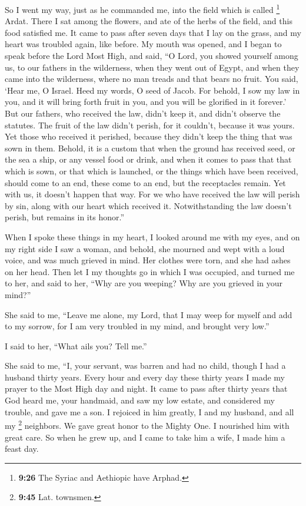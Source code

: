  So I went my way, just as he commanded me, into the
field which is called \footnote{\textbf{9:26} The Syriac and Aethiopic
  have Arphad.} Ardat. There I sat among the flowers, and ate of the
herbs of the field, and this food satisfied me.  It came
to pass after seven days that I lay on the grass, and my heart was
troubled again, like before.  My mouth was opened, and I
began to speak before the Lord Most High, and said,  ``O
Lord, you showed yourself among us, to our fathers in the wilderness,
when they went out of Egypt, and when they came into the wilderness,
where no man treads and that bears no fruit.  You said,
`Hear me, O Israel. Heed my words, O seed of Jacob.  For
behold, I sow my law in you, and it will bring forth fruit in you, and
you will be glorified in it forever.'  But our fathers,
who received the law, didn't keep it, and didn't observe the statutes.
The fruit of the law didn't perish, for it couldn't, because it was
yours.  Yet those who received it perished, because they
didn't keep the thing that was sown in them.  Behold, it
is a custom that when the ground has received seed, or the sea a ship,
or any vessel food or drink, and when it comes to pass that that which
is sown, or that which is launched,  or the things which
have been received, should come to an end, these come to an end, but the
receptacles remain. Yet with us, it doesn't happen that way.
 For we who have received the law will perish by sin,
along with our heart which received it.  Notwithstanding
the law doesn't perish, but remains in its honor.''

 When I spoke these things in my heart, I looked around
me with my eyes, and on my right side I saw a woman, and behold, she
mourned and wept with a loud voice, and was much grieved in mind. Her
clothes were torn, and she had ashes on her head.  Then
let I my thoughts go in which I was occupied, and turned me to her,
 and said to her, ``Why are you weeping? Why are you
grieved in your mind?''

 She said to me, ``Leave me alone, my Lord, that I may
weep for myself and add to my sorrow, for I am very troubled in my mind,
and brought very low.''

 I said to her, ``What ails you? Tell me.''

 She said to me, ``I, your servant, was barren and had no
child, though I had a husband thirty years.  Every hour
and every day these thirty years I made my prayer to the Most High day
and night.  It came to pass after thirty years that God
heard me, your handmaid, and saw my low estate, and considered my
trouble, and gave me a son. I rejoiced in him greatly, I and my husband,
and all my \footnote{\textbf{9:45} Lat. townsmen.} neighbors. We gave
great honor to the Mighty One.  I nourished him with
great care.  So when he grew up, and I came to take him a
wife, I made him a feast day.

